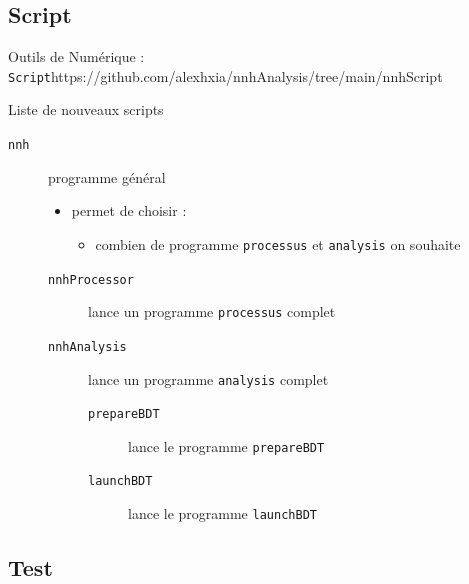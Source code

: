 \documentclass[9pt]{beamer}
\begin{document}

\subsection{Script}

\begin{frame}{Outils de Numérique : \texttt{Script}}{https://github.com/alexhxia/nnhAnalysis/tree/main/nnhScript}

\begin{block}{Liste de nouveaux scripts}
	\begin{description}
		\item[\texttt{nnh}] programme général 
		\begin{itemize}
			\item permet de choisir :
			\begin{itemize}
				\item combien de programme \texttt{processus} et \texttt{analysis} on souhaite
			\end{itemize}
		\end{itemize}
		\begin{description}
			\item[\texttt{nnhProcessor}] lance un programme \texttt{processus} complet
			\item[\texttt{nnhAnalysis}] lance un programme \texttt{analysis} complet
			\begin{description}
				\item[\texttt{prepareBDT}] lance le programme \texttt{prepareBDT}
				\item[\texttt{launchBDT}] lance le programme \texttt{launchBDT}
			\end{description}
		\end{description}
	\end{description}
\end{block}

\end{frame}



\subsection{Test}
\end{document}

